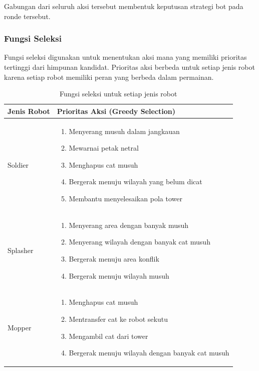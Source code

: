 \documentclass{article}
\begin{document}
Gabungan dari seluruh aksi tersebut membentuk keputusan strategi bot pada ronde tersebut.

\subsubsection{Fungsi Seleksi}

Fungsi seleksi digunakan untuk menentukan aksi mana yang memiliki prioritas tertinggi dari himpunan kandidat. Prioritas aksi berbeda untuk setiap jenis robot karena setiap robot memiliki peran yang berbeda dalam permainan.

\begin{table}[H]
\centering
\begin{tabular}{|p{3cm}|p{11cm}|}
\hline
\textbf{Jenis Robot} & \textbf{Prioritas Aksi (Greedy Selection)} \\
\hline
Soldier &
\begin{enumerate}
\item Menyerang musuh dalam jangkauan
\item Mewarnai petak netral
\item Menghapus cat musuh
\item Bergerak menuju wilayah yang belum dicat
\item Membantu menyelesaikan pola tower
\end{enumerate}
\\
\hline
Splasher &
\begin{enumerate}
\item Menyerang area dengan banyak musuh
\item Menyerang wilayah dengan banyak cat musuh
\item Bergerak menuju area konflik
\item Bergerak menuju wilayah musuh
\end{enumerate}
\\
\hline
Mopper &
\begin{enumerate}
\item Menghapus cat musuh
\item Mentransfer cat ke robot sekutu
\item Mengambil cat dari tower
\item Bergerak menuju wilayah dengan banyak cat musuh
\end{enumerate}
\\
\hline
\end{tabular}
\caption{Fungsi seleksi untuk setiap jenis robot}
\end{table}
\end{document}
